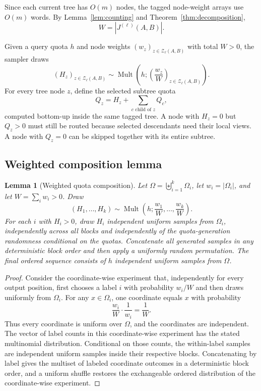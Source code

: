 \documentclass[11pt]{article}
\newcommand{\Mult}{\operatorname{Mult}}
\newcommand{\Znodes}{\mathcal Z}
\newtheorem{lemma}[theorem]{Lemma}
\theoremstyle{definition}
\begin{document}
Since each current tree has $O(m)$ nodes, the tagged node-weight arrays use $O(m)$ words.  By Lemma~\ref{lem:counting} and Theorem~\ref{thm:decomposition},
\[
  W=|J^{(\ell)}(A,B)|.
\]

Given a query quota $h$ and node weights $(w_z)_{z\in\Znodes_\ell(A,B)}$ with total $W>0$, the sampler draws
\[
  (H_z)_{z\in\Znodes_\ell(A,B)}
  \sim
  \Mult\left(h;\left(\frac{w_z}{W}\right)_{z\in\Znodes_\ell(A,B)}\right).
\]
For every tree node $z$, define the selected subtree quota
\[
  Q_z=H_z+\sum_{c\text{ child of }z}Q_c,
\]
computed bottom-up inside the same tagged tree.  A node with $H_z=0$ but $Q_z>0$ must still be routed because selected descendants need their local views.  A node with $Q_z=0$ can be skipped together with its entire subtree.

\subsection{Weighted composition lemma}

\begin{lemma}[Weighted quota composition]
\label{lem:quota}
Let $\Omega=\biguplus_{i=1}^k\Omega_i$, let $w_i=|\Omega_i|$, and let $W=\sum_iw_i>0$.  Draw
\[
  (H_1,\ldots,H_k)\sim
  \Mult\left(h;\frac{w_1}{W},\ldots,\frac{w_k}{W}\right).
\]
For each $i$ with $H_i>0$, draw $H_i$ independent uniform samples from $\Omega_i$, independently across all blocks and independently of the quota-generation randomness conditional on the quotas.  Concatenate all generated samples in any deterministic block order and then apply a uniformly random permutation.  The final ordered sequence consists of $h$ independent uniform samples from $\Omega$.
\end{lemma}

\begin{proof}
Consider the coordinate-wise experiment that, independently for every output position, first chooses a label $i$ with probability $w_i/W$ and then draws uniformly from $\Omega_i$.  For any $x\in\Omega_i$, one coordinate equals $x$ with probability
\[
  \frac{w_i}{W}\cdot\frac{1}{w_i}=\frac{1}{W}.
\]
Thus every coordinate is uniform over $\Omega$, and the coordinates are independent.  The vector of label counts in this coordinate-wise experiment has the stated multinomial distribution.  Conditional on those counts, the within-label samples are independent uniform samples inside their respective blocks.  Concatenating by label gives the multiset of labeled coordinate outcomes in a deterministic block order, and a uniform shuffle restores the exchangeable ordered distribution of the coordinate-wise experiment.
\end{proof}
\end{document}
